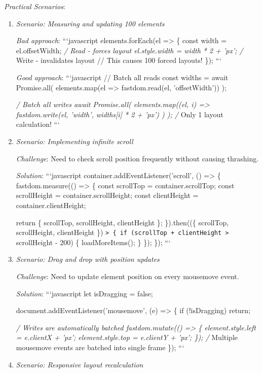 \documentclass[11pt]{article}
\begin{document}
\emph{Practical Scenarios}:

\begin{enumerate}
\item \emph{Scenario: Measuring and updating 100 elements}

\emph{Bad approach}:
```javascript
elements.forEach(el => \{
  const width = el.offsetWidth; \emph{/ Read - forces layout
  el.style.width = width * 2 + 'px'; /} Write - invalidates layout
  // This causes 100 forced layouts!
\});
```

\emph{Good approach}:
```javascript
// Batch all reads
const widths = await Promise.all(
  elements.map(el => fastdom.read(el, 'offsetWidth'))
);

\emph{/ Batch all writes
await Promise.all(
  elements.map((el, i) => 
    fastdom.write(el, 'width', widths[i] * 2 + 'px')
  )
);
/} Only 1 layout calculation!
```

\item \emph{Scenario: Implementing infinite scroll}

\emph{Challenge}: Need to check scroll position frequently without causing thrashing.

\emph{Solution}:
```javascript
container.addEventListener('scroll', () => \{
  fastdom.measure(() => \{
    const scrollTop = container.scrollTop;
    const scrollHeight = container.scrollHeight;
    const clientHeight = container.clientHeight;

    return \{ scrollTop, scrollHeight, clientHeight \};
  \}).then((\{ scrollTop, scrollHeight, clientHeight \}) \texttt{> \{
       if (scrollTop + clientHeight >} scrollHeight - 200) \{
      loadMoreItems();
    \}
  \});
\});
```

\item \emph{Scenario: Drag and drop with position updates}

\emph{Challenge}: Need to update element position on every mousemove event.

\emph{Solution}:
```javascript
let isDragging = false;

document.addEventListener('mousemove', (e) => \{
  if (!isDragging) return;

  \emph{/ Writes are automatically batched
  fastdom.mutate(() => \{
    element.style.left = e.clientX + 'px';
    element.style.top = e.clientY + 'px';
  \});
  /} Multiple mousemove events are batched into single frame
\});
```

\item \emph{Scenario: Responsive layout recalculation}


\end{enumerate}
\end{document}
